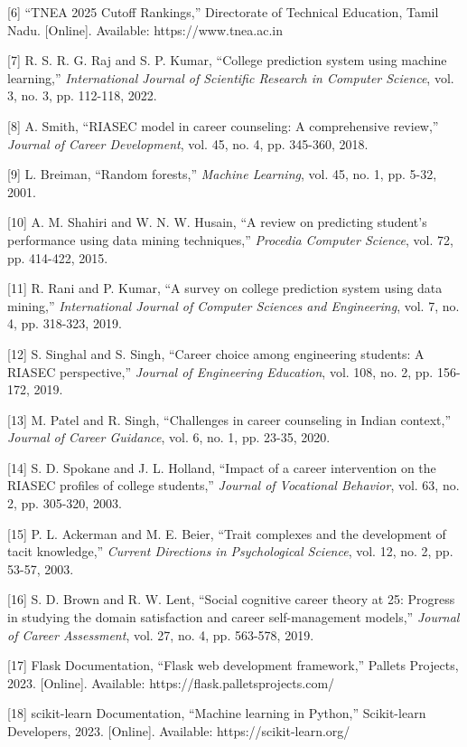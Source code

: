 \documentclass[journal]{IEEEtran}
\begin{document}
[6] ``TNEA 2025 Cutoff Rankings,'' Directorate of Technical Education, Tamil Nadu. [Online]. Available: https://www.tnea.ac.in

[7] R. S. R. G. Raj and S. P. Kumar, ``College prediction system using machine learning,'' \textit{International Journal of Scientific Research in Computer Science}, vol. 3, no. 3, pp. 112-118, 2022.

[8] A. Smith, ``RIASEC model in career counseling: A comprehensive review,'' \textit{Journal of Career Development}, vol. 45, no. 4, pp. 345-360, 2018.

[9] L. Breiman, ``Random forests,'' \textit{Machine Learning}, vol. 45, no. 1, pp. 5-32, 2001.

[10] A. M. Shahiri and W. N. W. Husain, ``A review on predicting student's performance using data mining techniques,'' \textit{Procedia Computer Science}, vol. 72, pp. 414-422, 2015.

[11] R. Rani and P. Kumar, ``A survey on college prediction system using data mining,'' \textit{International Journal of Computer Sciences and Engineering}, vol. 7, no. 4, pp. 318-323, 2019.

[12] S. Singhal and S. Singh, ``Career choice among engineering students: A RIASEC perspective,'' \textit{Journal of Engineering Education}, vol. 108, no. 2, pp. 156-172, 2019.

[13] M. Patel and R. Singh, ``Challenges in career counseling in Indian context,'' \textit{Journal of Career Guidance}, vol. 6, no. 1, pp. 23-35, 2020.

[14] S. D. Spokane and J. L. Holland, ``Impact of a career intervention on the RIASEC profiles of college students,'' \textit{Journal of Vocational Behavior}, vol. 63, no. 2, pp. 305-320, 2003.

[15] P. L. Ackerman and M. E. Beier, ``Trait complexes and the development of tacit knowledge,'' \textit{Current Directions in Psychological Science}, vol. 12, no. 2, pp. 53-57, 2003.

[16] S. D. Brown and R. W. Lent, ``Social cognitive career theory at 25: Progress in studying the domain satisfaction and career self-management models,'' \textit{Journal of Career Assessment}, vol. 27, no. 4, pp. 563-578, 2019.

[17] Flask Documentation, ``Flask web development framework,'' Pallets Projects, 2023. [Online]. Available: https://flask.palletsprojects.com/

[18] scikit-learn Documentation, ``Machine learning in Python,'' Scikit-learn Developers, 2023. [Online]. Available: https://scikit-learn.org/
\end{document}
